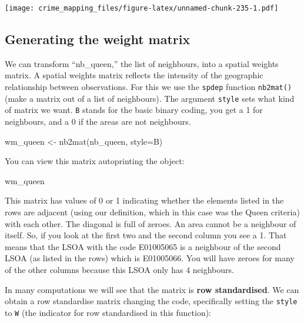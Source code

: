 \documentclass[
  krantz2]{krantz}
\makeatletter
\newenvironment{Shaded}{\begin{snugshade}}{\end{snugshade}}
\newcommand{\AttributeTok}[1]{\textcolor[rgb]{0.61,0.61,0.61}{#1}}
\newcommand{\FunctionTok}[1]{\textcolor[rgb]{0,0,0}{#1}}
\newcommand{\NormalTok}[1]{#1}
\newcommand{\OtherTok}[1]{\textcolor[rgb]{0.37,0.37,0.37}{#1}}
\newcommand{\StringTok}[1]{\textcolor[rgb]{0.5,0.5,0.5}{#1}}
\newenvironment{kframe}{%
\medskip{}
\setlength{\fboxsep}{.8em}
 \def\at@end@of@kframe{}%
 \ifinner\ifhmode%
  \def\at@end@of@kframe{\end{minipage}}%
  \begin{minipage}{\columnwidth}%
 \fi\fi%
 \def\FrameCommand##1{\hskip\@totalleftmargin \hskip-\fboxsep
 \colorbox{shadecolor}{##1}\hskip-\fboxsep
     \hskip-\linewidth \hskip-\@totalleftmargin \hskip\columnwidth}%
 \MakeFramed {\advance\hsize-\width
   \@totalleftmargin\z@ \linewidth\hsize
   \@setminipage}}%
 {\par\unskip\endMakeFramed%
 \at@end@of@kframe}
\renewenvironment{Shaded}{\begin{kframe}}{\end{kframe}}
\makeatother
\begin{document}
\texttt{[image: crime\_mapping\_files/figure-latex/unnamed-chunk-235-1.pdf]}

\hypertarget{generating-the-weight-matrix}{%
\subsection{Generating the weight matrix}\label{generating-the-weight-matrix}}

We can transform ``nb\_queen,'' the list of neighbours, into a spatial weights matrix. A spatial weights matrix reflects the intensity of the geographic relationship between observations. For this we use the \texttt{spdep} function \texttt{nb2mat()} (make a matrix out of a list of neighbours). The argument \texttt{style} sets what kind of matrix we want. \texttt{B} stands for the basic binary coding, you get a 1 for neighbours, and a 0 if the areas are not neighbours.

\begin{Shaded}
\begin{Highlighting}[]
\NormalTok{wm\_queen }\OtherTok{\textless{}{-}} \FunctionTok{nb2mat}\NormalTok{(nb\_queen, }\AttributeTok{style=}\StringTok{\textquotesingle{}B\textquotesingle{}}\NormalTok{)}
\end{Highlighting}
\end{Shaded}

You can view this matrix autoprinting the object:

\begin{Shaded}
\begin{Highlighting}[]
\NormalTok{wm\_queen}
\end{Highlighting}
\end{Shaded}

This matrix has values of 0 or 1 indicating whether the elements listed in the rows are adjacent (using our definition, which in this case was the Queen criteria) with each other. The diagonal is full of zeroes. An area cannot be a neighbour of itself. So, if you look at the first two and the second column you see a 1. That means that the LSOA with the code E01005065 is a neighbour of the second LSOA (as listed in the rows) which is E01005066. You will have zeroes for many of the other columns because this LSOA only has 4 neighbours.

In many computations we will see that the matrix is \textbf{row standardised}. We can obtain a row standardise matrix changing the code, specifically setting the \texttt{style} to \texttt{W} (the indicator for row standardised in this function):
\end{document}
